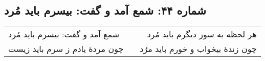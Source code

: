 \begin{center}
\section*{شماره ۴۴: شمع آمد و گفت: بیسرم باید مُرد}
\label{sec:044}
\begin{longtable}{l p{0.5cm} r}
شمع آمد و گفت: بیسرم باید مُرد
&&
هر لحظه به سوز دیگرم باید مُرد
\\
چون مردهٔ یادم ز سرم باید زیست
&&
چون زندهٔ بیخواب و خورم باید مرُد
\\
\end{longtable}
\end{center}
